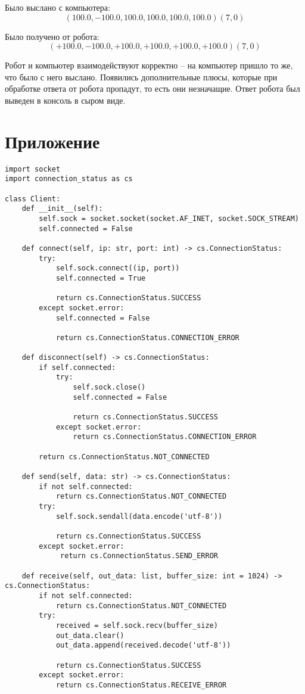 \documentclass[a4paper,14pt]{extarticle}
\begin{document}
Было выслано с компьютера:
$$
\left( 100.0, -100.0, 100.0, 100.0, 100.0, 100.0\right)\left( 7,0 \right)
$$


Было получено от робота:
$$
\left( +100.0, -100.0, +100.0, +100.0, +100.0, +100.0\right)\left( 7,0 \right)
$$


Робот и компьютер взаимодействуют корректно -- на компьютер пришло то же,
что было с него выслано. Появились дополнительные плюсы, которые при
обработке ответа от робота пропадут, то есть они незначащие. Ответ
робота был выведен в консоль в сыром виде.


\appendix
\renewcommand{\thesection}{\Asbuk{section}}

\section{Приложение}
\begin{lstlisting}[label=lst:client, caption={Основа для общения компьютера с роботом.}]
import socket
import connection_status as cs

class Client:
    def __init__(self):
        self.sock = socket.socket(socket.AF_INET, socket.SOCK_STREAM)
        self.connected = False

    def connect(self, ip: str, port: int) -> cs.ConnectionStatus:
        try:
            self.sock.connect((ip, port))
            self.connected = True

            return cs.ConnectionStatus.SUCCESS
        except socket.error:
            self.connected = False

            return cs.ConnectionStatus.CONNECTION_ERROR

    def disconnect(self) -> cs.ConnectionStatus:
        if self.connected:
            try:
                self.sock.close()
                self.connected = False

                return cs.ConnectionStatus.SUCCESS
            except socket.error:
                return cs.ConnectionStatus.CONNECTION_ERROR
        
        return cs.ConnectionStatus.NOT_CONNECTED

    def send(self, data: str) -> cs.ConnectionStatus:
        if not self.connected:
            return cs.ConnectionStatus.NOT_CONNECTED
        try:
            self.sock.sendall(data.encode('utf-8'))

            return cs.ConnectionStatus.SUCCESS
        except socket.error:
             return cs.ConnectionStatus.SEND_ERROR

    def receive(self, out_data: list, buffer_size: int = 1024) -> cs.ConnectionStatus:
        if not self.connected:
            return cs.ConnectionStatus.NOT_CONNECTED
        try:
            received = self.sock.recv(buffer_size)
            out_data.clear()
            out_data.append(received.decode('utf-8'))

            return cs.ConnectionStatus.SUCCESS
        except socket.error:
            return cs.ConnectionStatus.RECEIVE_ERROR
\end{lstlisting}
\end{document}
